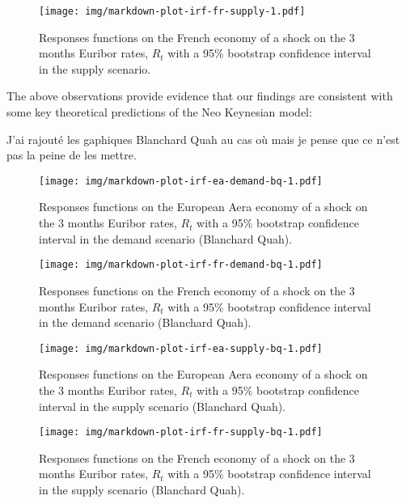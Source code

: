 \documentclass[
  10pt,
]{article}
\begin{document}
\begin{figure}
\centering
\texttt{[image: img/markdown-plot-irf-fr-supply-1.pdf]}
\caption{\label{fig:plot-irf-fr-supply}Responses functions on the French economy of a shock on the 3 months Euribor rates, \(R_t\) with a 95\% bootstrap confidence interval in the supply scenario.}
\end{figure}

The above observations provide evidence that our findings are consistent with some key theoretical predictions of the Neo Keynesian model:

\newpage

J'ai rajouté les gaphiques Blanchard Quah au cas où mais je pense que ce n'est pas la peine de les mettre.

\begin{figure}
\centering
\texttt{[image: img/markdown-plot-irf-ea-demand-bq-1.pdf]}
\caption{\label{fig:plot-irf-ea-demand-bq}Responses functions on the European Aera economy of a shock on the 3 months Euribor rates, \(R_t\) with a 95\% bootstrap confidence interval in the demand scenario (Blanchard Quah).}
\end{figure}

\begin{figure}
\centering
\texttt{[image: img/markdown-plot-irf-fr-demand-bq-1.pdf]}
\caption{\label{fig:plot-irf-fr-demand-bq}Responses functions on the French economy of a shock on the 3 months Euribor rates, \(R_t\) with a 95\% bootstrap confidence interval in the demand scenario (Blanchard Quah).}
\end{figure}

\begin{figure}
\centering
\texttt{[image: img/markdown-plot-irf-ea-supply-bq-1.pdf]}
\caption{\label{fig:plot-irf-ea-supply-bq}Responses functions on the European Aera economy of a shock on the 3 months Euribor rates, \(R_t\) with a 95\% bootstrap confidence interval in the supply scenario (Blanchard Quah).}
\end{figure}

\begin{figure}
\centering
\texttt{[image: img/markdown-plot-irf-fr-supply-bq-1.pdf]}
\caption{\label{fig:plot-irf-fr-supply-bq}Responses functions on the French economy of a shock on the 3 months Euribor rates, \(R_t\) with a 95\% bootstrap confidence interval in the supply scenario (Blanchard Quah).}
\end{figure}

\newpage
\end{document}
